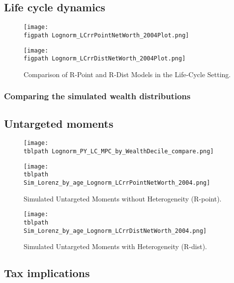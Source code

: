 \subsection{Life cycle dynamics}

\par 

\begin{figure}[h]
    \centering
    \begin{minipage}{0.48\textwidth}
        \centering
        \texttt{[image: \\figpath Lognorm\_LCrrPointNetWorth\_2004Plot.png]}
    \end{minipage}
    \hfill
    \begin{minipage}{0.48\textwidth}
        \centering
        \texttt{[image: \\figpath Lognorm\_LCrrDistNetWorth\_2004Plot.png]}
    \end{minipage}
    \caption{Comparison of R-Point and R-Dist Models in the Life-Cycle Setting.}
    \label{fig:LCLognorm} 
\end{figure}

\subsubsection{Comparing the simulated wealth distributions}

\par



\subsection{Untargeted moments}

\par 

\begin{figure}[htbp]
\centering
\texttt{[image: \\tblpath Lognorm\_PY\_LC\_MPC\_by\_WealthDecile\_compare.png]}
\label{fig:LognormPYLCMPCCompare}
\end{figure}

\begin{figure}[htbp]
\centering
\texttt{[image: \\tblpath Sim\_Lorenz\_by\_age\_Lognorm\_LCrrPointNetWorth\_2004.png]}
\caption{Simulated Untargeted Moments without Heterogeneity (R-point).}
\label{fig:SimLorenzTarPoint}
\end{figure}

\begin{figure}[htbp]
\centering
\texttt{[image: \\tblpath Sim\_Lorenz\_by\_age\_Lognorm\_LCrrDistNetWorth\_2004.png]}
\caption{Simulated Untargeted Moments with Heterogeneity (R-dist).}
\label{fig:SimLorenzTarDist}
\end{figure}

\subsection{Tax implications}

\par 



\par




